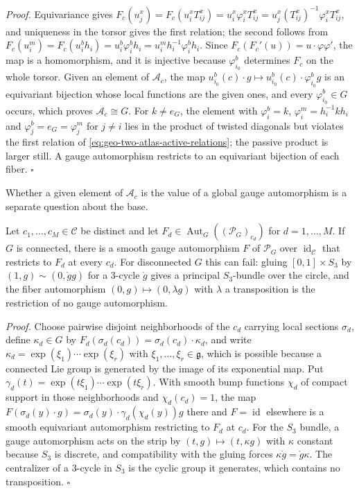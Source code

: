 \noindent\emph{Proof.}
Equivariance gives
\(F_c(u_j^x)=F_c(u_i^xT_{ij}^x)=u_i^x\varphi_i^xT_{ij}^x=u_j^x(T_{ij}^x)^{-1}\varphi_i^xT_{ij}^x\),
and uniqueness in the torsor gives the first relation; the second follows from
\(F_c(u_i^m)=F_c(u_i^bh_i)=u_i^b\varphi_i^bh_i=u_i^mh_i^{-1}\varphi_i^bh_i\). Since
\(F_c(F_c'(u))=u\cdot\varphi\varphi'\), the map is a homomorphism, and it is injective because
\(\varphi_{i_0}^b\) determines \(F_c\) on the whole torsor. Given an element of \(\mathcal A_c\), the
map \(u_{i_0}^b(c)\cdot g\mapsto u_{i_0}^b(c)\cdot\varphi_{i_0}^bg\) is an equivariant bijection
whose local functions are the given ones, and every \(\varphi_{i_0}^b\in G\) occurs, which proves
\(\mathcal A_c\cong G\). For \(k\neq e_G\), the element with \(\varphi_{i}^b=k\), \(\varphi_i^m=h_i^{-1}
kh_i\) and \(\varphi_j^b=e_G=\varphi_j^m\) for \(j\neq i\) lies in the product of twisted diagonals
but violates the first relation of \eqref{eq:geo-two-atlas-active-relations}; the passive product is
larger still. A gauge automorphism restricts to an equivariant bijection of each fiber.
\hfill$\square$

Whether a given element of \(\mathcal A_c\) is the value of a global gauge automorphism is a
separate question about the base.

Let \(c_1,\ldots,c_M\in\mathcal C\) be distinct and let
\(F_d\in\operatorname{Aut}_G((\mathscr P_G)_{c_d})\) for \(d=1,\ldots,M\). If \(G\) is connected,
there is a smooth gauge automorphism \(F\) of \(\mathscr P_G\) over \(\operatorname{id}_{\mathcal C}\)
that restricts to \(F_d\) at every \(c_d\). For disconnected \(G\) this can fail: gluing
\([0,1]\times S_3\) by \((1,g)\sim(0,\mathring g g)\) for a \(3\)-cycle \(\mathring g\) gives a principal
\(S_3\)-bundle over the circle, and the fiber automorphism \((0,g)\mapsto(0,\lambda g)\) with
\(\lambda\) a transposition is the restriction of no gauge automorphism.

\noindent\emph{Proof.}
Choose pairwise disjoint neighborhoods of the \(c_d\) carrying local sections \(\sigma_d\), define
\(\kappa_d\in G\) by \(F_d(\sigma_d(c_d))=\sigma_d(c_d)\cdot\kappa_d\), and write
\(\kappa_d=\exp(\xi_1)\cdots\exp(\xi_r)\) with \(\xi_1,\ldots,\xi_r\in\mathfrak g\), which is
possible because a connected Lie group is generated by the image of its exponential map. Put
\(\gamma_d(t)=\exp(t\xi_1)\cdots\exp(t\xi_r)\). With smooth bump functions \(\chi_d\) of compact
support in those neighborhoods and \(\chi_d(c_d)=1\), the map
\(F(\sigma_d(y)\cdot g)=\sigma_d(y)\cdot\gamma_d(\chi_d(y))g\) there and \(F=\operatorname{id}\)
elsewhere is a smooth equivariant automorphism restricting to \(F_d\) at \(c_d\). For the \(S_3\)
bundle, a gauge automorphism acts on the strip by \((t,g)\mapsto(t,\kappa g)\) with \(\kappa\)
constant because \(S_3\) is discrete, and compatibility with the gluing forces
\(\kappa\mathring g=\mathring g\kappa\). The centralizer of a \(3\)-cycle in \(S_3\) is the cyclic group it
generates, which contains no transposition. \hfill$\square$

